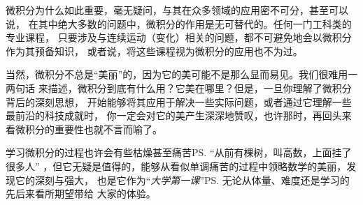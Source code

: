微积分为什么如此重要，毫无疑问，与其在众多领域的应用密不可分，甚至可以说，
在其中绝大多数的问题中，微积分的作用是无可替代的。任何一门工科类的专业课程，
只要涉及与连续运动（变化）相关的问题，都不可避免地会以微积分作为其预备知识，
或者说，将这些课程视为微积分的应用也不为过。

当然，微积分不总是“美丽”的，因为它的美可能不是那么显而易见。我们很难用一两句话
来描述，微积分到底有什么用？它美在哪里？但是，一旦你理解了微积分背后的深刻思想，
开始能够将其应用于解决一些实际问题，或者通过它理解一些最前沿的科技成就时，
你一定会对它的美产生深深地赞叹，也许那时，再回头来看微积分的重要性也就不言而喻了。

学习微积分的过程也许会有些枯燥甚至痛苦\ps{“从前有棵树，叫高数，上面挂了很多人”}
，但它无疑是值得的，能够从看似单调痛苦的过程中领略数学的美丽，发现它的深刻与强大，
也是它作为“{\it 大学第一课}”\ps{无论从体量、难度还是学习的先后来看}所期望带给
大家的体验。

